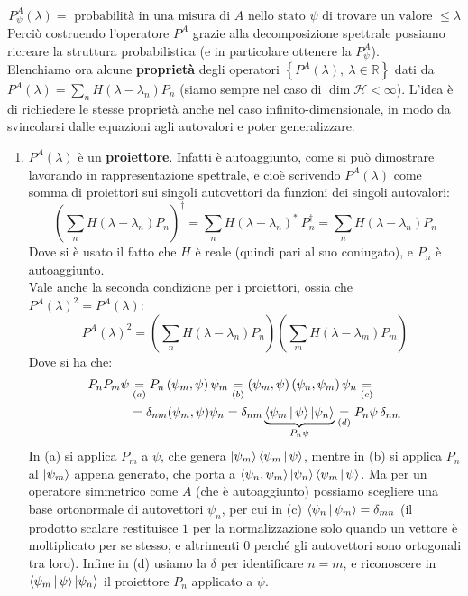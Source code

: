 \documentclass[../../FisicaTeorica.tex]{subfiles}
\begin{document}
\[
P_\psi^A\left(\lambda\right)=\text{ probabilità in una misura di $A$ nello stato $\psi$  di trovare un valore }\leq \lambda 
\]
Perciò costruendo l'operatore $P^A$ grazie alla decomposizione spettrale possiamo ricreare la struttura probabilistica (e in particolare ottenere la  $P^A_\psi$).\\
Elenchiamo ora alcune \textbf{proprietà} degli operatori $\left\{P^A\left(\lambda\right),\ \lambda\in\mathbb{R}\right\}$ dati da $P^A(\lambda) = \sum_n H(\lambda-\lambda_n)P_n$
(siamo sempre nel caso di $\dim{\mathcal{H}}<\infty$). L'idea è di richiedere le stesse proprietà anche nel caso infinito-dimensionale, in modo da svincolarsi dalle equazioni agli autovalori e poter generalizzare.
\begin{enumerate}
    \item $P^A(\lambda)$ è un \textbf{proiettore}. Infatti è autoaggiunto, come si può dimostrare lavorando in rappresentazione spettrale, e cioè scrivendo $P^A(\lambda)$ come somma di proiettori sui singoli autovettori  da funzioni dei singoli autovalori:
    \[
	\left(\sum_{n}{H\left(\lambda-\lambda_n\right)P_n}\right)^\dag=\sum_{n}{H\left(\lambda-\lambda_n\right)^\ast\ P_n^\dag}=\sum_{n}{H\left(\lambda-\lambda_n\right)P_n}
	\]
	Dove si è usato il fatto che $H$ è reale (quindi pari al suo coniugato), e $P_n$ è autoaggiunto.\\
	Vale anche la seconda condizione per i proiettori, ossia che $P^A(\lambda)^2 = P^A(\lambda)$:
	\begin{equation}
	P^A\left(\lambda\right)^2
	=\left(\sum_{n}{H\left(\lambda-\lambda_n\right)P_n}\right)\left(\sum_{m}{H\left(\lambda-\lambda_m\right)P_m}\right)
	\label{eqn:PAquadro}
	\end{equation}
	Dove si ha che:
	\begin{align*}
	P_nP_m\psi&\underset{(a)}{=}P_n\left(\psi_m,\psi\right)\psi_m \underset{(b)}{=}\left(\psi_m,\psi\right)\left(\psi_n,\psi_m\right)\psi_n \underset{(c)}{=}\\
	&= \delta_{nm}(\psi_m, \psi) \psi_n = 
	\delta_{nm}\underbrace{\Braket{\psi_m | \psi}\Ket{\psi_n}}_{P_n\psi}  \underset{(d)}{=} 
	P_n\psi\,\delta_{nm}
	\end{align*}
	In (a) si applica $P_m$ a $\psi$, che genera $\Ket{\psi_m}\Braket{\psi_m|\psi}$, mentre in (b) si applica $P_n$ al $\Ket{\psi_m}$ appena generato, che porta a $\Braket{\psi_n, \psi_m}\Ket{\psi_n} \Braket{\psi_m|\psi}$. Ma per un operatore simmetrico come $A$ (che è autoaggiunto) possiamo scegliere una base ortonormale di autovettori $\psi_n$, per cui in (c) $\Braket{\psi_n|\psi_m} = \delta_{mn}$ (il prodotto scalare restituisce $1$ per la normalizzazione solo quando un vettore è moltiplicato per se stesso, e altrimenti $0$ perché gli autovettori sono ortogonali tra loro). Infine in (d) usiamo la $\delta$ per identificare $n=m$, e riconoscere in $\Braket{\psi_m | \psi}\Ket{\psi_n}$ il proiettore $P_n$ applicato a $\psi$.\\

\end{enumerate}
\end{document}
